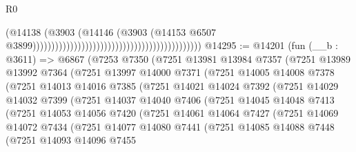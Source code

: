 \begin{lexlean}{R0}
\begin{coremodule}
                                                                                    (@14138
                                                                                      (@3903
                                                                                        (@14146
                                                                                          (@3903
                                                                                            (@14153
                                                                                              @6507
                                                                                              @3899)))))))))))))))))))))))))))))))))))))))))))))
@14295 := @14201
    (fun (__b : @3611) =>
    @6867
      (@7253
        @7350
        (@7251
          @13981
          @13984
          @7357
          (@7251
            @13989
            @13992
            @7364
            (@7251
              @13997
              @14000
              @7371
              (@7251
                @14005
                @14008
                @7378
                (@7251
                  @14013
                  @14016
                  @7385
                  (@7251
                    @14021
                    @14024
                    @7392
                    (@7251
                      @14029
                      @14032
                      @7399
                      (@7251
                        @14037
                        @14040
                        @7406
                        (@7251
                          @14045
                          @14048
                          @7413
                          (@7251
                            @14053
                            @14056
                            @7420
                            (@7251
                              @14061
                              @14064
                              @7427
                              (@7251
                                @14069
                                @14072
                                @7434
                                (@7251
                                  @14077
                                  @14080
                                  @7441
                                  (@7251
                                    @14085
                                    @14088
                                    @7448
                                    (@7251
                                      @14093
                                      @14096
                                      @7455

\end{coremodule}
\end{lexlean}

